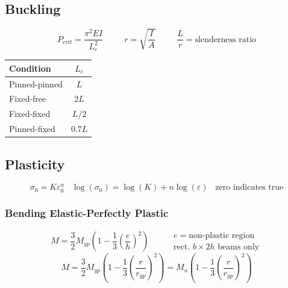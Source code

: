 \documentclass[twocolumn, 12pt]{article}    %
\begin{document}
\subsection*{Buckling}
\begin{equation*}
    P_{crit} = \frac{\pi^2EI}{L_e^2} \hspace{30pt} r= \sqrt{\frac{I}{A}} \hspace{30pt} \frac{L}{r} = \text{slenderness ratio}
\end{equation*}
\begin{table}[h!]
    \centering
    \footnotesize
    \begin{tabular}{l|c}
        Condition & \(L_e\) \\
        \hline
        Pinned-pinned & \(L\)\\
        Fixed-free & \(2L\)\\
        Fixed-fixed & \(L/2\)\\
        Pinned-fixed & \(0.7L\)
    \end{tabular}
\end{table}

\subsection*{Plasticity}
\begin{equation*}
    \sigma_0 = K\varepsilon^n_0 \hspace{10pt} \log(\sigma_0) = \log(K) + n\log(\varepsilon) \hspace{10pt}  \text{zero indicates true}
\end{equation*}
\subsubsection*{Bending Elastic-Perfectly Plastic}
\begin{equation*}
    M = \frac{3}{2} M_{yp} \left(1 -\frac{1}{3}\left(\frac{e}{h} \right)^2 \right) \hspace{30pt} \begin{matrix} 
        e =\text{non-plastic region} \\
        \text{rect. } b\times2h \text{ beams only}
    \end{matrix}
\end{equation*}
\begin{equation*}
    M = \frac{3}{2} M_{yp} \left(1 - \frac{1}{3}\left(\frac{r}{r_{yp}} \right)^2 \right) = M_u \left( 1 - \frac{1}{3} \left(\frac{r}{r_{yp}} \right)^2\right)
\end{equation*}
\end{document}
